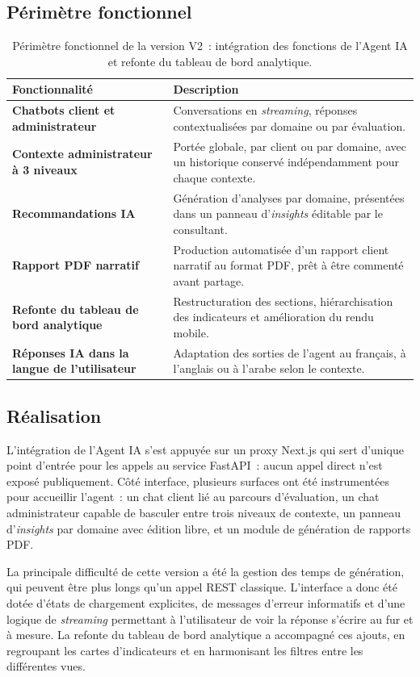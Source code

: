 \documentclass[12pt,a4paper]{report}
\begin{document}
\subsection*{Périmètre fonctionnel}
\begin{table}[H]
\centering
\caption{Périmètre fonctionnel de la version V2~: intégration des fonctions de l'Agent IA et refonte du tableau de bord analytique.}
\begin{tabularx}{\textwidth}{>{\bfseries}L{4.6cm}Y}
\toprule
Fonctionnalité & Description \\
\midrule
Chatbots client et administrateur & Conversations en \textit{streaming}, réponses contextualisées par domaine ou par évaluation. \\
Contexte administrateur à 3 niveaux & Portée globale, par client ou par domaine, avec un historique conservé indépendamment pour chaque contexte. \\
Recommandations IA & Génération d'analyses par domaine, présentées dans un panneau d'\textit{insights} éditable par le consultant. \\
Rapport PDF narratif & Production automatisée d'un rapport client narratif au format PDF, prêt à être commenté avant partage. \\
Refonte du tableau de bord analytique & Restructuration des sections, hiérarchisation des indicateurs et amélioration du rendu mobile. \\
Réponses IA dans la langue de l'utilisateur & Adaptation des sorties de l'agent au français, à l'anglais ou à l'arabe selon le contexte. \\
\bottomrule
\end{tabularx}
\label{tab:v2}
\end{table}

\subsection*{Réalisation}
L'intégration de l'Agent IA s'est appuyée sur un proxy Next.js qui sert d'unique point d'entrée pour les appels au service FastAPI~: aucun appel direct n'est exposé publiquement. Côté interface, plusieurs surfaces ont été instrumentées pour accueillir l'agent~: un chat client lié au parcours d'évaluation, un chat administrateur capable de basculer entre trois niveaux de contexte, un panneau d'\textit{insights} par domaine avec édition libre, et un module de génération de rapports PDF.

La principale difficulté de cette version a été la gestion des temps de génération, qui peuvent être plus longs qu'un appel REST classique. L'interface a donc été dotée d'états de chargement explicites, de messages d'erreur informatifs et d'une logique de \textit{streaming} permettant à l'utilisateur de voir la réponse s'écrire au fur et à mesure. La refonte du tableau de bord analytique a accompagné ces ajouts, en regroupant les cartes d'indicateurs et en harmonisant les filtres entre les différentes vues.
\end{document}
